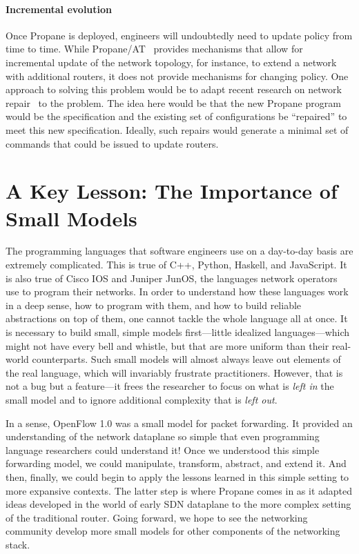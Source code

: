 \documentclass[10pt]{sigalternate052015}
\begin{document}
\paragraph*{Incremental evolution}
Once Propane is deployed, engineers will undoubtedly need to update
policy from time to time.  While
Propane/AT~\cite{abstract-propane} provides mechanisms that allow for
incremental update of the network topology, for instance, to extend a
network with additional routers, it does not provide mechanisms for
changing policy.  One approach to solving this problem would be to
adapt recent research on network repair~\cite{Gember-Jacobson:SOSP17}
to the problem.  The idea here would be that the new Propane
program would be the specification and the existing set of
configurations be ``repaired'' to meet this new specification.
Ideally, such repairs would generate a minimal set of commands that
could be issued to update routers.

\section{A Key Lesson:  The Importance of Small Models}
\label{sec:conclusions}

The programming languages that software engineers use on a day-to-day
basis are extremely complicated.  This is true of C++, Python, Haskell, and
JavaScript.  It is also true of Cisco IOS and Juniper JunOS, the
languages network operators use to program their networks.  In order to understand
how these languages work in a deep sense, how to program with them,
and how to build reliable abstractions on top of them, one cannot
tackle the whole language all at once.  It is necessary to build
small, simple models first---little idealized languages---which might
not have every bell and whistle, but that are more uniform than their
real-world counterparts.  Such
small models will almost always leave out elements of the
real language, which will invariably frustrate practitioners.
However, that is
not a bug  but a feature---it frees the researcher to focus on
what is \emph{left in} the small model and to ignore additional
complexity that is \emph{left out}.

In a sense, OpenFlow 1.0 was a small model for packet forwarding.  It
provided an understanding of the network dataplane so
simple that even programming language researchers could understand it!
Once we understood this simple forwarding model,
we could manipulate, transform, abstract, and extend it. And then, finally,
we could begin to apply the lessons learned in this simple setting to
more expansive contexts.  The
latter step is where Propane comes in as it adapted ideas developed in
the world of early SDN dataplane to the
more complex setting of the traditional router.  Going forward, we hope
to see the networking community develop more small models for other
components of the networking stack.
\end{document}
